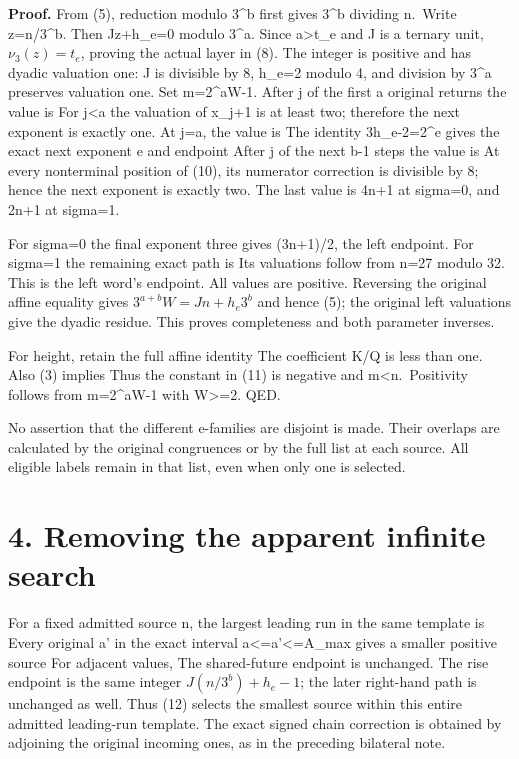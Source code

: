 \textbf{Proof.} From (5), reduction modulo 3\^{}b first gives 3\^{}b
dividing n.~Write z=n/3\^{}b. Then Jz+h\_e=0 modulo 3\^{}a. Since
a\textgreater t\_e and J is a ternary unit, \(\nu_3(z)=t_e\), proving
the actual layer in (8). The integer 
is positive and has dyadic valuation one: J is divisible by 8, h\_e=2
modulo 4, and division by 3\^{}a preserves valuation one. Set
m=2\^{}aW-1. After j of the first a original returns the value is
 For j\textless a
the valuation of x\_j+1 is at least two; therefore the next exponent is
exactly one. At j=a, the value is
 The identity 3h\_e-2=2\^{}e
gives the exact next exponent e and endpoint
 After j of the next b-1
steps the value is
At every nonterminal position of (10), its numerator correction is
divisible by 8; hence the next exponent is exactly two. The last value
is 4n+1 at sigma=0, and 2n+1 at sigma=1.

For sigma=0 the final exponent three gives (3n+1)/2, the left endpoint.
For sigma=1 the remaining exact path is
 Its valuations follow from n=27 modulo 32.
This is the left word's endpoint. All values are positive. Reversing the
original affine equality gives \(3^{a+b}W=Jn+h_e3^b\) and hence (5); the
original left valuations give the dyadic residue. This proves
completeness and both parameter inverses.

For height, retain the full affine identity
 The coefficient K/Q is less than
one. Also (3) implies  Thus the constant in (11) is
negative and m\textless n.~Positivity follows from m=2\^{}aW-1 with
W\textgreater=2. QED.

No assertion that the different e-families are disjoint is made. Their
overlaps are calculated by the original congruences or by the full list
at each source. All eligible labels remain in that list, even when only
one is selected.

\section{4. Removing the apparent infinite search}

For a fixed admitted source n, the largest leading run in the same
template is 
Every original a' in the exact interval a\textless=a'\textless=A\_max
gives a smaller positive source
 For
adjacent values,
The shared-future endpoint is unchanged. The rise endpoint is the same
integer \(J(n/3^b)+h_e-1\); the later right-hand path is unchanged as
well. Thus (12) selects the smallest source within this entire admitted
leading-run template. The exact signed chain correction is obtained by
adjoining the original incoming ones, as in the preceding bilateral
note.

